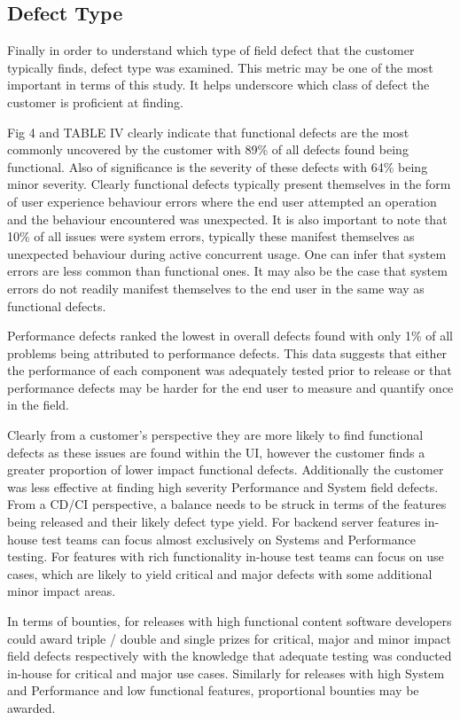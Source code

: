 \documentclass[conference]{IEEEtran}
\begin{document}
\subsection{Defect Type}
Finally in order to understand which type of field defect that the customer typically finds, defect type was examined. This metric may be one of the most important in terms of this study. It helps underscore which class of defect the customer is proficient at finding. \par
Fig 4 and TABLE IV clearly indicate that functional defects are the most commonly uncovered by the customer with 89\% of all defects found being functional. Also of significance is the severity of these defects with 64\% being minor severity. Clearly functional defects typically present themselves in the form of user experience behaviour errors where the end user attempted an operation and the behaviour encountered was unexpected. It is also important to note that 10\% of all issues were system errors, typically these manifest themselves as unexpected behaviour during active concurrent usage. One can infer that system errors are less common than functional ones. It may also be the case that system errors do not readily manifest themselves to the end user in the same way as functional defects. \par
Performance defects ranked the lowest in overall defects found with only 1\% of all problems being attributed to performance defects.  This data suggests that either the performance of each component was adequately tested prior to release or that performance defects may be harder for the end user to measure and quantify once in the field.  \par
Clearly from a customer's perspective they are more likely to find functional defects as these issues are found within the UI, however the customer finds a greater proportion of lower impact functional defects. Additionally the customer was less effective at finding high severity Performance and System field defects. From a CD/CI perspective, a balance needs to be struck in terms of the features being released and their likely defect type yield. For backend server features in-house test teams can focus almost exclusively on Systems and Performance testing. For features with rich functionality in-house test teams can focus on use cases, which are likely to yield critical and major defects with some additional minor impact areas. \par
In terms of bounties, for releases with high functional content software developers could award triple / double and single prizes for critical, major and minor impact field defects respectively with the knowledge that adequate testing was conducted in-house for critical and major use cases. Similarly for releases with high System and Performance and low functional features, proportional bounties may be awarded.
\end{document}
